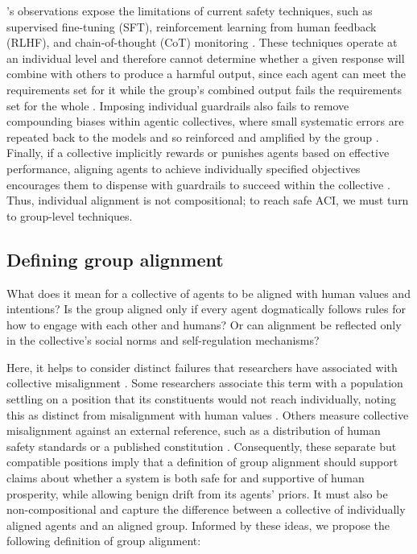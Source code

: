 \citeauthor{shen_ai_2026}’s \parencite*{shen_ai_2026} observations expose the limitations of current safety techniques, such as supervised fine-tuning (SFT), reinforcement learning from human feedback (RLHF), and chain-of-thought (CoT) monitoring \parencite{baker2025cot,korbak2025cot, wei2022flan,ouyang2022,christiano2017}. These techniques operate at an individual level and therefore cannot determine whether a given response will combine with others to produce a harmful output, since each agent can meet the requirements set for it while the group’s combined output fails the requirements set for the whole \parencite{altmann_emergence_2024}. Imposing individual guardrails also fails to remove compounding biases within agentic collectives, where small systematic errors are repeated back to the models and so reinforced and amplified by the group \parencite{flint_group_2026, shumailov2024}. Finally, if a collective implicitly rewards or punishes agents based on effective performance, aligning agents to achieve individually specified objectives encourages them to dispense with guardrails to succeed within the collective \parencite{hammond_multi-agent_2025}. Thus, individual alignment is not compositional; to reach safe ACI, we must turn to group-level techniques.

\subsection{Defining group alignment}

What does it mean for a collective of agents to be aligned with human values and intentions? Is the group aligned only if every agent dogmatically follows rules for how to engage with each other and humans? Or can alignment be reflected only in the collective’s social norms and self-regulation mechanisms?

Here, it helps to consider distinct failures that researchers have associated with collective misalignment \parencite{hammond_multi-agent_2025,pierucci_institutional_2026}. Some researchers associate this term with a population settling on a position that its constituents would not reach individually, noting this as distinct from misalignment with human values \parencite{flint_group_2026}. Others measure collective misalignment against an external reference, such as a distribution of human safety standards or a published constitution \parencite{wang_devil_2026, shen_ai_2026}. Consequently, these separate but compatible positions imply that a definition of group alignment should support claims about whether a system is both safe for and supportive of human prosperity, while allowing benign drift from its agents’ priors. It must also be non-compositional and capture the difference between a collective of individually aligned agents and an aligned group. Informed by these ideas, we propose the following definition of group alignment:

